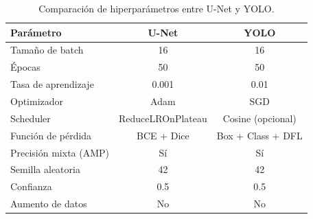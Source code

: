 \documentclass[../main.tex]{subfiles}
\begin{document}
\begin{table}[h]
\centering
\caption{Comparación de hiperparámetros entre U-Net y YOLO.}
\label{tab:hiperparametros}
\begin{tabular}{lcc}
\toprule
\textbf{Parámetro} & \textbf{U-Net} & \textbf{YOLO} \\
\midrule
Tamaño de batch       & 16                & 16 \\
Épocas                & 50                & 50 \\
Tasa de aprendizaje   & 0.001             & 0.01 \\
Optimizador           & Adam              & SGD \\
Scheduler             & ReduceLROnPlateau & Cosine (opcional) \\
Función de pérdida    & BCE + Dice        & Box + Class + DFL \\
Precisión mixta (AMP) & Sí                & Sí \\
Semilla aleatoria     & 42                & 42 \\
Confianza             & 0.5               & 0.5 \\
Aumento de datos      & No                & No \\
\bottomrule
\end{tabular}
\end{table}
\end{document}
